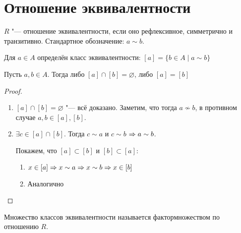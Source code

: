 ﻿\section{Отношение эквивалентности}

\begin{Def}
    $R$ "--- отношение эквивалентности, если оно рефлексивное, симметрично и транзитивно. Стандартное
    обозначение: $a \sim b$.
\end{Def}
\begin{Def}
    Для $a \in A$ определён
    класс эквивалентности: $[a] = \{b \in A \mid a \sim b\}$
\end{Def}

\begin{theorem}{}
Пусть $a, b \in A$. Тогда либо $[a]\cap [b] = \varnothing$, либо $[a] = [b]$ 
\end{theorem}

\begin{proof}
\begin{enumerate}
\item $[a] \cap [b] = \varnothing$ "--- всё доказано. Заметим, что тогда $a \nsim b$, в противном случае $a, b \in [a], [b]$.
\item $\exists c \in [a] \cap [b]$. Тогда $c \sim a$ и $c \sim b$ $\Rightarrow a \sim b$.

Покажем, что $[a] \subset [b]$ и $[b] \subset [a]$:

\begin{enumerate}
\item $x \in [a] \Rightarrow x \sim a \Rightarrow x \sim b \Rightarrow x \in [b]$
\item Аналогично
\end{enumerate}
\end{enumerate}

\end{proof}

Множество классов эквивалентности называется фактормножеством по отношению $R$.
